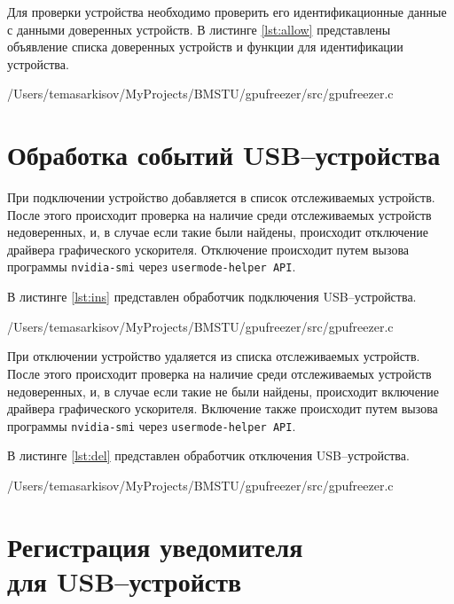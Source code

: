 Для проверки устройства необходимо проверить его идентификационные данные с данными доверенных устройств. В листинге \ref{lst:allow} представлены объявление списка доверенных устройств и функции для идентификации устройства.

\newpage
\begin{lstinputlisting}[
	caption={Функции для идентификации устройств},
	label={lst:allow},
	style={c},
	linerange={18-21, 25-81},
	]{/Users/temasarkisov/MyProjects/BMSTU/gpufreezer/src/gpufreezer.c}
\end{lstinputlisting}

\section{Обработка событий USB--устройства}

При подключении устройство добавляется в список отслеживаемых устройств. После этого происходит проверка на наличие среди отслеживаемых устройств недоверенных, и, в случае если такие были найдены, происходит отключение драйвера графического ускорителя. Отключение происходит путем вызова программы \texttt{nvidia-smi} через \texttt{usermode-helper API}.

В листинге \ref{lst:ins} представлен обработчик подключения USB--устройства.

\begin{lstinputlisting}[
	caption={Обработчик подключения USB--устройства},
	label={lst:ins},
	style={c},
	linerange={106-145},
	]{/Users/temasarkisov/MyProjects/BMSTU/gpufreezer/src/gpufreezer.c}
\end{lstinputlisting}

При отключении устройство удаляется из списка отслеживаемых устройств. После этого происходит проверка на наличие среди отслеживаемых устройств недоверенных, и, в случае если такие не были найдены, происходит включение драйвера графического ускорителя. Включение также происходит путем вызова программы \texttt{nvidia-smi} через \texttt{usermode-helper API}.

В листинге \ref{lst:del} представлен обработчик отключения USB--устройства.

\begin{lstinputlisting}[
	caption={Обработчик отключения USB--устройства},
	label={lst:del},
	style={c},
	linerange={147-178},
	]{/Users/temasarkisov/MyProjects/BMSTU/gpufreezer/src/gpufreezer.c}
\end{lstinputlisting}

\section{Регистрация уведомителя\\ для USB--устройств}


